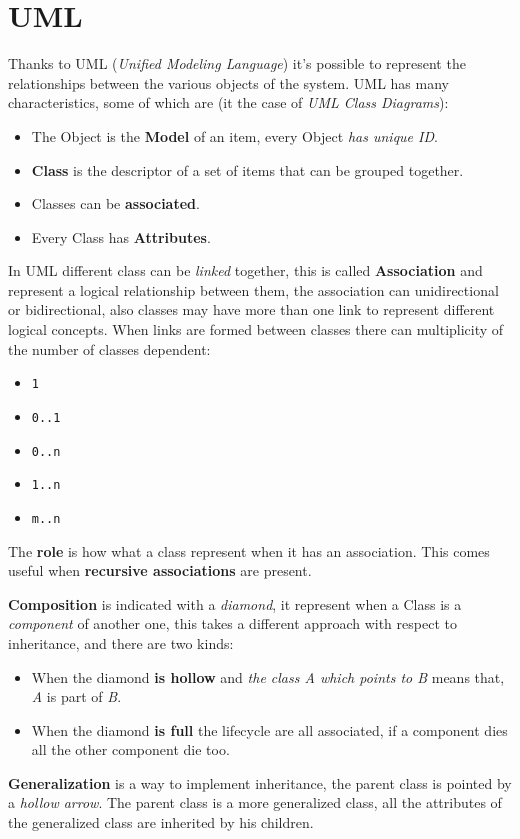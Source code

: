 \documentclass[12pt]{article}
\begin{document}
\section{UML}
Thanks to UML (\emph{Unified Modeling Language}) it's possible to represent the relationships between the various objects of the system. UML has many characteristics, some of which are (it the case of \emph{UML Class Diagrams}):
\begin{itemize}
  \item The Object is the \textbf{Model} of an item, every Object \emph{has unique ID}.
  \item \textbf{Class} is the descriptor of a set of items that can be grouped together.
  \item Classes can be \textbf{associated}.
  \item Every Class has \textbf{Attributes}.
\end{itemize}
In UML different class can be \emph{linked} together, this is called \textbf{Association} and represent a logical relationship between them, the association can unidirectional or bidirectional, also classes may have more than one link to represent different logical concepts. When links are formed between classes there can multiplicity of the number of classes dependent:
\begin{itemize}
  \item \texttt{1}
  \item \texttt{0..1}
  \item \texttt{0..n}
  \item \texttt{1..n}
  \item \texttt{m..n}
\end{itemize}
The \textbf{role} is how what a class represent when it has an association. This comes useful when \textbf{recursive associations} are present.

\hfill

\textbf{Composition} is indicated with a \emph{diamond}, it represent when a Class is a \emph{component} of another one, this takes a different approach with respect to inheritance, and there are two kinds:
\begin{itemize}
  \item When the diamond \textbf{is hollow} and \emph{the class A which points to B} means that, \emph{A} is part of \emph{B}.
  \item When the diamond \textbf{is full} the lifecycle are all associated, if a component dies all the other component die too.
\end{itemize}
\textbf{Generalization} is a way to implement inheritance, the parent class is pointed by a \emph{hollow arrow}. The parent class is a more generalized class, all the attributes of the generalized class are inherited by his children.
\end{document}
